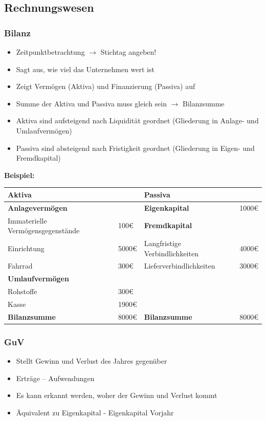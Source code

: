 \documentclass[titlepage,parskip=half]{scrartcl}
\begin{document}
\subsection{Rechnungswesen}
\subsubsection{Bilanz}
\begin{itemize}
    \item Zeitpunktbetrachtung $\rightarrow$ Stichtag angeben!
    \item Sagt aus, wie viel das Unternehmen wert ist
    \item Zeigt Vermögen (Aktiva) und Finanzierung (Passiva) auf
    \item Summe der Aktiva und Passiva muss gleich sein $\rightarrow$ Bilanzsumme
    \item Aktiva sind aufsteigend nach Liquidität geordnet (Gliederung in Anlage- und Umlaufvermögen)
    \item Passiva sind absteigend nach Fristigkeit geordnet (Gliederung in Eigen- und Fremdkapital)
\end{itemize}

\textbf{Beispiel:}

\begin{tabularx}{\textwidth}{|X|l|X|l|} \hline
    \textbf{Aktiva} & & \textbf{Passiva} & \\ \hline
    \textbf{Anlagevermögen} & & \textbf{Eigenkapital} & 1000€ \\ \hline
    Immaterielle Vermögensgegenstände & 100€ & \textbf{Fremdkapital} & \\ \hline
    Einrichtung & 5000€ & Langfristige Verbindlichkeiten & 4000€ \\ \hline
    Fahrrad & 300€ & Lieferverbindlichkeiten & 3000€ \\ \hline
    \textbf{Umlaufvermögen} & & & \\ \hline
    Rohstoffe & 300€ & & \\ \hline
    Kasse & 1900€ & & \\ \hline
    \textbf{Bilanzsumme} & 8000€ & \textbf{Bilanzsumme} & 8000€ \\ \hline
\end{tabularx}

\subsubsection{GuV}
\begin{itemize}
    \item Stellt Gewinn und Verlust des Jahres gegenüber
    \item Erträge -- Aufwendungen 
    \item Es kann erkannt werden, woher der Gewinn und Verlust kommt
    \item Äquivalent zu Eigenkapital - Eigenkapital Vorjahr
\end{itemize}
\end{document}
